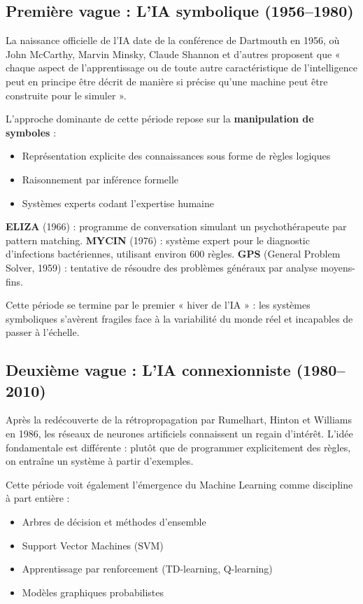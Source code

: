 \documentclass[11pt,a4paper]{article}
\begin{document}
\subsection{Première vague : L'IA symbolique (1956--1980)}

La naissance officielle de l'IA date de la conférence de Dartmouth en 1956, où John McCarthy, Marvin Minsky, Claude Shannon et d'autres proposent que « chaque aspect de l'apprentissage ou de toute autre caractéristique de l'intelligence peut en principe être décrit de manière si précise qu'une machine peut être construite pour le simuler ».

L'approche dominante de cette période repose sur la \textbf{manipulation de symboles} :
\begin{itemize}
    \item Représentation explicite des connaissances sous forme de règles logiques
    \item Raisonnement par inférence formelle
    \item Systèmes experts codant l'expertise humaine
\end{itemize}

\begin{exemplebox}
\textbf{ELIZA} (1966) : programme de conversation simulant un psychothérapeute par pattern matching. \textbf{MYCIN} (1976) : système expert pour le diagnostic d'infections bactériennes, utilisant environ 600 règles. \textbf{GPS} (General Problem Solver, 1959) : tentative de résoudre des problèmes généraux par analyse moyens-fins.
\end{exemplebox}

Cette période se termine par le premier « hiver de l'IA » : les systèmes symboliques s'avèrent fragiles face à la variabilité du monde réel et incapables de passer à l'échelle.

\subsection{Deuxième vague : L'IA connexionniste (1980--2010)}

Après la redécouverte de la rétropropagation par Rumelhart, Hinton et Williams en 1986, les réseaux de neurones artificiels connaissent un regain d'intérêt. L'idée fondamentale est différente : plutôt que de programmer explicitement des règles, on entraîne un système à partir d'exemples.

Cette période voit également l'émergence du Machine Learning comme discipline à part entière :
\begin{itemize}
    \item Arbres de décision et méthodes d'ensemble
    \item Support Vector Machines (SVM)
    \item Apprentissage par renforcement (TD-learning, Q-learning)
    \item Modèles graphiques probabilistes
\end{itemize}
\end{document}
